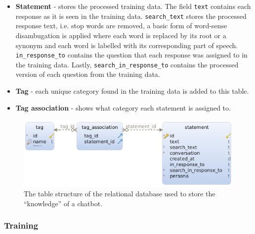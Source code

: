 \documentclass[12pt,a4paper]{article}
\newcommand{\captionstyle}[1] {
    \small{#1}
}
\begin{document}
\begin{itemize}
	\item \textbf{Statement} - stores the processed training data. The field \texttt{text} contains each response as it is seen in the training data. \texttt{search\_text} stores the processed response text, i.e. stop words are removed, a basic form of word-sense disambugation is applied where each word is replaced by its root or a synonym and each word is labelled with its corresponding part of speech. \texttt{in\_response\_to} contains the question that each response was assigned to in the training data. Lastly, \texttt{search\_in\_response\_to} contains the processed version of each question from the training data.
	\item \textbf{Tag} - each unique category found in the training data is added to this table.
	\item \textbf{Tag association} - shows what category each statement is assigned to.
\end{itemize}

\begin{figure}[!htb]%
    \centering
    \includegraphics[width=0.9\columnwidth]{db-schema}%
    \caption{\captionstyle{The table structure of the relational database used to store the \enquote{knowledge} of a chatbot.}}%
    \label{fig:db-schema}%
\end{figure}


\subsubsection{Training}
\end{document}
